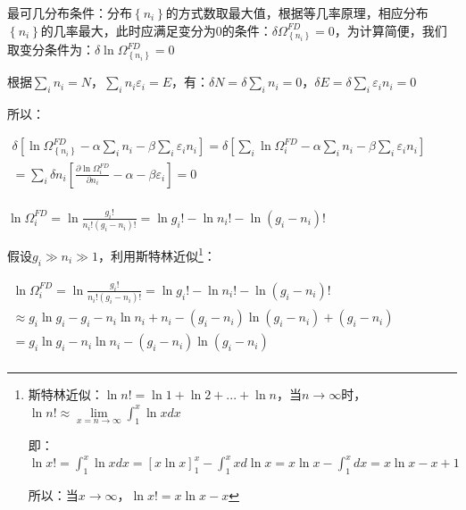 
最可几分布条件：分布$\left\{ {n_i } \right\}$的方式数取最大值，根据等几率原理，相应分布$\left\{ {n_i } \right\}$的几率最大，此时应满足变分为0的条件：$\delta \Omega _{\left\{ {n_i } \right\}}^{FD}  = 0$，为计算简便，我们取变分条件为：$\delta \ln \Omega _{\left\{ {n_i } \right\}}^{FD}  = 0$

根据$\sum\limits_i {n_i }  = N$，$\sum\limits_i {n_i \varepsilon _i }  = E$，有：$\delta N = \delta \sum\limits_i {n_i }  = 0$，$\delta E = \delta \sum\limits_i {\varepsilon _i n_i }  = 0$

所以：

$\begin{array}{l}
 \delta \left[ {\ln \Omega _{\left\{ {n_i } \right\}}^{FD}  - \alpha \sum\limits_i {n_i }  - \beta \sum\limits_i {\varepsilon _i n_i } } \right] = \delta \left[ {\sum\limits_i {\ln \Omega _i^{FD} }  - \alpha \sum\limits_i {n_i }  - \beta \sum\limits_i {\varepsilon _i n_i } } \right] \\
  = \sum\limits_i {\delta n_i \left[ {\frac{{\partial \ln \Omega _i^{FD} }}{{\partial n_i }} - \alpha  - \beta \varepsilon _i } \right]}  = 0 \\
 \end{array}$


$\ln \Omega _i^{FD}  = \ln \frac{{g_i !}}{{n_i !\left( {g_i  - n_i } \right)!}} = \ln g_i ! - \ln n_i ! - \ln \left( {g_i  - n_i } \right)!$



假设$g_i  \gg n_i  \gg 1$，利用斯特林近似\footnote{斯特林近似：$\ln n! = \ln 1 + \ln 2 + ... + \ln n$，当$n \to \infty $时，$\ln n! \approx \mathop {\lim }\limits_{x = n \to \infty } \int_1^x {\ln xdx} $

即：$\ln x! = \int_1^x {\ln xdx}  = \left[ {x\ln x} \right]_1^x  - \int_1^x {xd\ln x}  = x\ln x - \int_1^x {dx}  = x\ln x - x + 1$

所以：当$x \to \infty $，$\ln x! = x\ln x - x$}：


$\begin{array}{l}
 \ln \Omega _i^{FD}  = \ln \frac{{g_i !}}{{n_i !\left( {g_i  - n_i } \right)!}} = \ln g_i ! - \ln n_i ! - \ln \left( {g_i  - n_i } \right)! \\
  \approx g_i \ln g_i  - g_i  - n_i \ln n_i  + n_i  - \left( {g_i  - n_i } \right)\ln \left( {g_i  - n_i } \right) + \left( {g_i  - n_i } \right) \\
  = g_i \ln g_i  - n_i \ln n_i  - \left( {g_i  - n_i } \right)\ln \left( {g_i  - n_i } \right) \\
 \end{array}$


